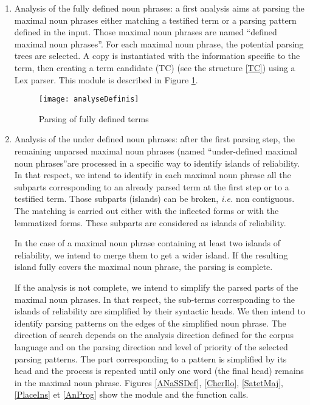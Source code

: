 \begin{enumerate}
\item Analysis of the fully defined noun phrases: a first analysis
  aims at parsing the maximal noun phrases either matching a testified
  term or a parsing
  pattern defined in the input. %
  Those maximal noun phrases are
  named ``defined maximal noun phrases''. For each maximal noun phrase,
  the potential parsing trees are selected. A copy is instantiated with
  the information specific to the term, then creating a term candidate
  (TC) (see the structure \ref{TC})
  using a Lex parser. This module is described in Figure
  \ref{ANaDef}.

\begin{figure}[!htbp]
\begin{center}
\texttt{[image: analyseDefinis]}
\caption{Parsing of fully defined terms}\label{ANaDef}
\end{center}
\end{figure}

\item Analysis of the under defined noun phrases: after the first
  parsing step, the remaining unparsed maximal noun phrases (named
  ``under-defined maximal noun phrases''are processed in a specific way to
  identify islands of reliability. In that respect, we intend to
  identify in each maximal noun phrase all the subparts corresponding
  to an already parsed term at the first step or to  a testified
  term. Those subparts (islands) can be broken, \textit{i.e.}  non contiguous. The matching is carried
  out either with the inflected forms or with the lemmatized
  forms. These subparts are considered as islands of reliability.


  In the case of a maximal noun phrase containing at least two islands
  of reliability, we intend to merge them to get a wider island. If
  the resulting island fully covers the maximal noun phrase, the
  parsing is complete.

  If the analysis is not complete, we intend to simplify the parsed
  parts of the maximal noun phrases. In that respect, the sub-terms
  corresponding to the islands of reliability are simplified by their
  syntactic heads. We then intend to identify parsing patterns on the
  edges of the simplified
  noun phrase. The direction of search depends on the analysis
  direction defined for the corpus language and on the parsing direction and level of
  priority of the selected parsing patterns.  The part corresponding
  to a pattern is simplified by its head and the process is 
  repeated until only one word (the final head) remains in the maximal 
  noun phrase. Figures
  \ref{ANaSSDef}, \ref{CherIlo}, \ref{SatetMaj}, \ref{PlaceIns}  et \ref{AnProg}
  show the module and the function calls.


\end{enumerate}

